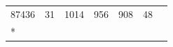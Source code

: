 \documentclass[
  12pt,
  oneside,
  openany]{book}
\begin{document}
\begin{appendices}
\begin{singlespace}
\begin{longtable}[]{@{}lllllll@{}}
\begin{minipage}[t]{0.16\columnwidth}
87436\strut
\end{minipage} & \begin{minipage}[t]{0.16\columnwidth}\raggedright
31\strut
\end{minipage} & \begin{minipage}[t]{0.11\columnwidth}\raggedright
1014\strut
\end{minipage} & \begin{minipage}[t]{0.07\columnwidth}\raggedright
956\strut
\end{minipage} & \begin{minipage}[t]{0.07\columnwidth}\raggedright
908\strut
\end{minipage} & \begin{minipage}[t]{0.10\columnwidth}\raggedright
48\strut
\end{minipage}\tabularnewline*
\bottomrule
\end{longtable}
\end{singlespace}


\end{appendices}
\end{document}
